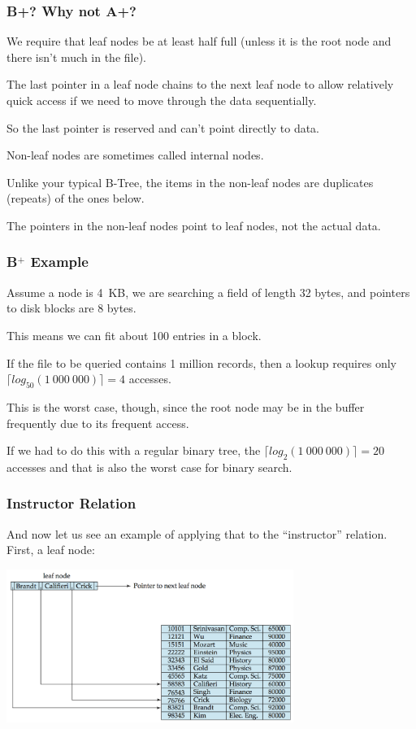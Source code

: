 \begin{frame}
\frametitle{B+? Why not A+?}

We require that leaf nodes be at least half full (unless it is the root node and there isn't much in the file). 

The last pointer in a leaf node chains to the next leaf node to allow relatively quick access if we need to move through the data sequentially. 

So the last pointer is reserved and can't point directly to data. 

Non-leaf nodes are sometimes called internal nodes. 

Unlike your typical B-Tree, the items in the non-leaf nodes are duplicates (repeats) of the ones below. 

The pointers in the non-leaf nodes point to leaf nodes, not the actual data.


\end{frame}

\begin{frame}
\frametitle{B$^{+}$ Example}

Assume a node is 4~KB, we are searching a field of length 32 bytes, and pointers to disk blocks are 8 bytes. 

This means we can fit about 100 entries in a block. 

If the file to be queried contains 1 million records, then a lookup requires only $\lceil log_{50}(1~000~000) \rceil = 4$ accesses. 

This is the worst case, though, since the root node may be in the buffer frequently due to its frequent access. 

If we had to do this with a regular binary tree, the $\lceil log_{2}(1~000~000) \rceil = 20$ accesses and that is also the worst case for binary search.


\end{frame}

\begin{frame}
\frametitle{Instructor Relation}

And now let us see an example of applying that to the ``instructor'' relation. First, a leaf node:

\begin{center}
	\includegraphics[width=0.7\textwidth]{images/b-tree-instructor.png}
\end{center}

\end{frame}

